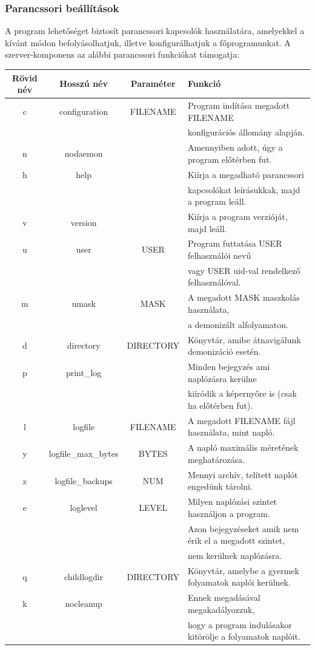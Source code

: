 \documentclass[12pt]{report}
\begin{document}
  \subsubsection{Parancssori beállítások}
  A program lehetőséget biztosít parancssori kapcsolók használatára, amelyekkel a kívánt módon befolyásolhatjuk, illetve konfigurálhatjuk a főprogramunkat.
  A szerver-komponens az alábbi parancssori funkciókat támogatja: \\
  \begin{adjustbox}{max width=\textwidth}  
  \begin{tabular}{ c | c | c | l }
  \textbf{Rövid név} & \textbf{Hosszú név} & \textbf{Paraméter} & \textbf{Funkció} \\ \hline
  c & configuration & FILENAME & Program indítása megadott FILENAME \\
  &&&  konfigurációs állomány alapján. \\ \hline
  n & nodaemon & & Amennyiben adott, úgy a program előtérben fut. \\ \hline
  h & help & & Kiírja a megadható parancssori \\
  &&& kapcsolókat leírásukkak, majd a program leáll. \\ \hline
  v & version & & Kiírja a program verzióját, majd leáll. \\ \hline
  u & user & USER & Program futtatása USER felhasználói nevű \\ 
  &&& vagy USER uid-val rendelkező felhasználóval. \\ \hline
  m & umask & MASK & A megadott MASK maszkolás használata, \\
  &&& a demonizált alfolyamaton. \\ \hline
  d & directory & DIRECTORY & Könyvtár, amibe átnavigálunk demonizáció esetén. \\ \hline
  p & print\_log & & Minden bejegyzés ami naplózásra kerülne \\
  &&& kiíródik a képernyőre is (csak ha előtérben fut). \\ \hline
  l & logfile & FILENAME & A megadott FILENAME fájl használata, mint napló. \\ \hline
  y & logfile\_max\_bytes & BYTES & A napló maximális méretének meghatározása. \\ \hline
  z & logfile\_backups & NUM & Mennyi archív, telített naplót engedünk tárolni. \\ \hline
  e & loglevel & LEVEL & Milyen naplózási szintet használjon a program. \\
  &&& Azon bejegyzéseket amik nem érik el a megadott szintet, \\
  &&& nem kerülnek naplózásra. \\ \hline
  q & childlogdir & DIRECTORY & Könyvtár, amelybe a gyermek folyamatok naplói kerülnek. \\ \hline
  k & nocleanup & & Ennek megadásával megakadályozzuk, \\
  &&& hogy a program indulásakor kitörölje a folyamatok naplóit. \\
  \end{tabular}
  \end{adjustbox}
\end{document}
